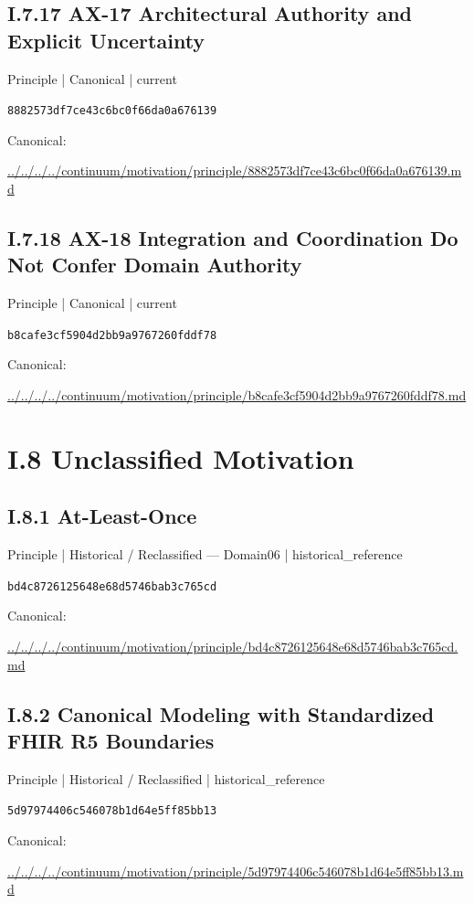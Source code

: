 \documentclass[10pt,a4paper]{article}
\begin{document}
\subsection*{I.7.17 AX-17 Architectural Authority and Explicit Uncertainty}
{\small Principle | Canonical | current}\par
\texttt{8882573df7ce43c6bc0f66da0a676139}\par
Canonical: \par
{\footnotesize\url{../../../../continuum/motivation/principle/8882573df7ce43c6bc0f66da0a676139.md}}\par
\subsection*{I.7.18 AX-18 Integration and Coordination Do Not Confer Domain Authority}
{\small Principle | Canonical | current}\par
\texttt{b8cafe3cf5904d2bb9a9767260fddf78}\par
Canonical: \par
{\footnotesize\url{../../../../continuum/motivation/principle/b8cafe3cf5904d2bb9a9767260fddf78.md}}\par
\section*{I.8 Unclassified Motivation}
\subsection*{I.8.1 At-Least-Once}
{\small Principle | Historical / Reclassified — Domain06 | historical\_reference}\par
\texttt{bd4c8726125648e68d5746bab3c765cd}\par
Canonical: \par
{\footnotesize\url{../../../../continuum/motivation/principle/bd4c8726125648e68d5746bab3c765cd.md}}\par
\subsection*{I.8.2 Canonical Modeling with Standardized FHIR R5 Boundaries}
{\small Principle | Historical / Reclassified | historical\_reference}\par
\texttt{5d97974406c546078b1d64e5ff85bb13}\par
Canonical: \par
{\footnotesize\url{../../../../continuum/motivation/principle/5d97974406c546078b1d64e5ff85bb13.md}}\par
\end{document}
